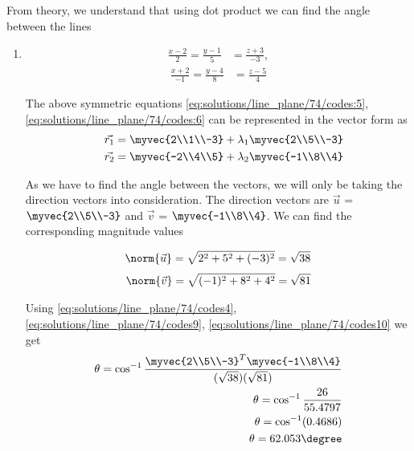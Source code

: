 From theory, we understand that using dot product we can find the angle between the lines 
\begin{enumerate}
	\item 
	\begin{align}\label{eq:solutions/line_plane/74/codes:5}
		\frac{x-2}{2} = \frac{y-1}{5} &= \frac{z+3}{-3}, 
	\end{align}
	\begin{align}\label{eq:solutions/line_plane/74/codes:6}
		\frac{x+2}{-1} = \frac{y-4}{8} &= \frac{z-5}{4} 
	\end{align}


The above symmetric equations \ref{eq:solutions/line_plane/74/codes:5}, \ref{eq:solutions/line_plane/74/codes:6} can be represented in the vector form as 
\begin{align}\label{eq:solutions/line_plane/74/codes7}
	\quad \vec{r_1} &= \myvec{2\\1\\-3} + \lambda_1\myvec{2\\5\\-3}
	\\
	\quad \vec{r_2} &= \myvec{-2\\4\\5} + \lambda_2\myvec{-1\\8\\4}
\end{align}

As we have to find the angle between the vectors, we will only be taking the direction vectors into consideration. The direction vectors are $\vec{u}$ = $\myvec{2\\5\\-3}$ and $\vec{v}$ = $\myvec{-1\\8\\4}$. We can find the corresponding magnitude values

\begin{align}\label{eq:solutions/line_plane/74/codes9}
	\norm{\vec{u}} =\sqrt{2^{2}+5^{2}+(-3)^{2}} =\sqrt{38}
\end{align}
\begin{align}\label{eq:solutions/line_plane/74/codes10}
	\norm{\vec{v}} =\sqrt{(-1)^{2}+8^{2}+4^{2}} =\sqrt{81}
\end{align}

Using \ref{eq:solutions/line_plane/74/codes4}, \ref{eq:solutions/line_plane/74/codes9}, \ref{eq:solutions/line_plane/74/codes10} we get
\begin{align}
	\theta = \cos ^{-1}\frac{\myvec{2\\5\\-3}^{T}\myvec{-1\\8\\4}}{(\sqrt{38})(\sqrt{81})} 
	\\
	\theta = \cos ^{-1}\frac{26}{55.4797}
	\\
	\theta = \cos ^{-1} (0.4686)
	\\
	\theta = 62.053\degree
\end{align}


\end{enumerate}
